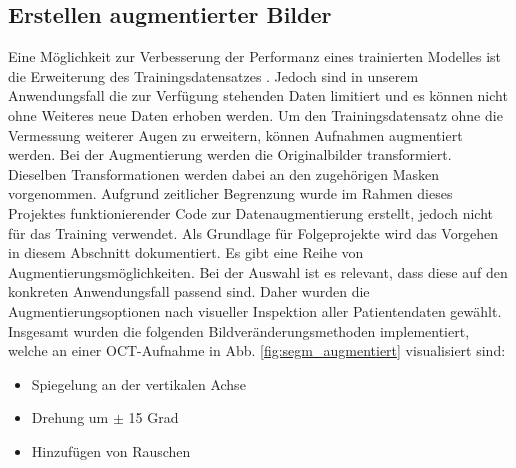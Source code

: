 \subsection{Erstellen augmentierter Bilder}
Eine Möglichkeit zur Verbesserung der Performanz eines trainierten Modelles ist die Erweiterung des Trainingsdatensatzes \cite{14}. 
Jedoch sind in unserem Anwendungsfall die zur Verfügung stehenden Daten limitiert und es können nicht ohne Weiteres neue Daten erhoben werden.\newline
Um den Trainingsdatensatz ohne die Vermessung weiterer Augen zu erweitern, können Aufnahmen augmentiert werden. Bei der Augmentierung werden die Originalbilder transformiert. Dieselben Transformationen werden dabei an den zugehörigen Masken vorgenommen.\newline
Aufgrund zeitlicher Begrenzung wurde im Rahmen dieses Projektes funktionierender Code zur Datenaugmentierung erstellt, jedoch nicht für das Training verwendet. Als Grundlage für Folgeprojekte wird das Vorgehen in diesem Abschnitt dokumentiert.\newline
Es gibt eine Reihe von Augmentierungsmöglichkeiten. Bei der Auswahl ist es relevant, dass diese auf den konkreten Anwendungsfall passend sind. Daher wurden die Augmentierungsoptionen nach visueller Inspektion aller Patientendaten gewählt.
Insgesamt wurden die folgenden Bildveränderungsmethoden implementiert, welche an einer OCT-Aufnahme in Abb. \ref{fig:segm_augmentiert} visualisiert sind:
\begin{itemize}
    \item Spiegelung an der vertikalen Achse
    \item Drehung um  $\pm$ 15 Grad
    \item Hinzufügen von Rauschen
\end{itemize}

